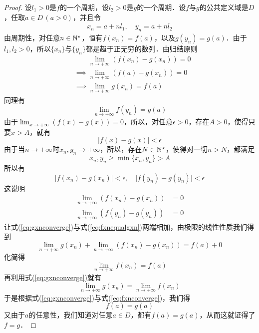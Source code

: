 \begin{proof}
设$l_1>0$是$f$的一个周期，设$l_2>0$是$g$的一个周期．设$f$与$g$的公共定义域是$D$，任取$a \in D \, (a > 0)$，并且令
\begin{align}
    x_n = a + n l_1, \quad y_n = a + n l_2
\end{align}
由周期性，对任意$n \in \mathbb{N}^\star$，恒有$f(x_n) = f(a)$，以及$g(y_n) = g(a)$．由于$l_1, l_2 > 0$，所以$\{ x_n \}$与$\{ y_n \}$都是趋于正无穷的数列．由归结原则
\begin{align}
    &\mathrel{\phantom{\implies}} \lim_{n \to +\infty} \left(f(x_n) - g(x_n)\right) = 0 \\
    &\implies \lim_{n \to +\infty} \left(f(a) - g(x_n)\right) = 0 \\
    &\implies \lim_{n \to +\infty} g(x_n) = f(a) \label{eq:gxnconverge}
\end{align}
同理有
\begin{equation}
    \lim_{n \to +\infty} f(y_n) = g(a) \label{eq:fxnconverge}
\end{equation}
由于$\displaystyle\lim_{x \to +\infty} \left(f(x) - g(x)\right) = 0$，所以，对任意$\epsilon > 0$，存在$A > 0$，使得只要$x > A$，就有
\begin{equation}
    \lvert f(x) - g(x) \rvert < \epsilon
\end{equation}
由于当$n \to +\infty$时$x_n, y_n \to +\infty$，所以，存在$N \in \mathbb{N}^\star$，使得对一切$n > N$，都满足
\begin{equation}
    x_n, y_n \geq \min \{ x_n, y_n \} > A
\end{equation}
所以有
\begin{equation}
\lvert f(x_n) - g(x_n) \rvert < \epsilon, \quad \lvert f(y_n) - g(y_n) \rvert < \epsilon
\end{equation}
这说明
\begin{align}
    \lim_{n \to +\infty} \left( f(x_n) - g(x_n) \right) &= 0 \label{eq:fxnequalgxn} \\
    \lim_{n \to +\infty} \left(f(y_n) - g(y_n)\right) &= 0 \label{eq:fynequalgyn}
\end{align}
让式(\ref{eq:gxnconverge})与式(\ref{eq:fxnequalgxn})两端相加，由极限的线性性质我们得到
\begin{equation}
    \lim_{n \to +\infty} g(x_n) + \lim_{n \to +\infty} \left(f(x_n) - g(x_n)\right) = f(a) + 0
\end{equation}
化简得
\begin{equation}
    \lim_{n \to +\infty} f(x_n) = f(a)
\end{equation}
再利用式(\ref{eq:gxnconverge})就有
\begin{equation}
    \lim_{n \to +\infty} g(x_n) = \lim_{n \to +\infty} f(x_n)
\end{equation}
于是根据式(\ref{eq:gxnconverge})与式(\ref{eq:fxnconverge})，我们得
\begin{equation}
    f(a) = g(a)
\end{equation}
又由于$a$的任意性，我们知道对任意$a \in D$，都有$f(a) = g(a)$，从而这就证得了$f = g$．
\end{proof}
